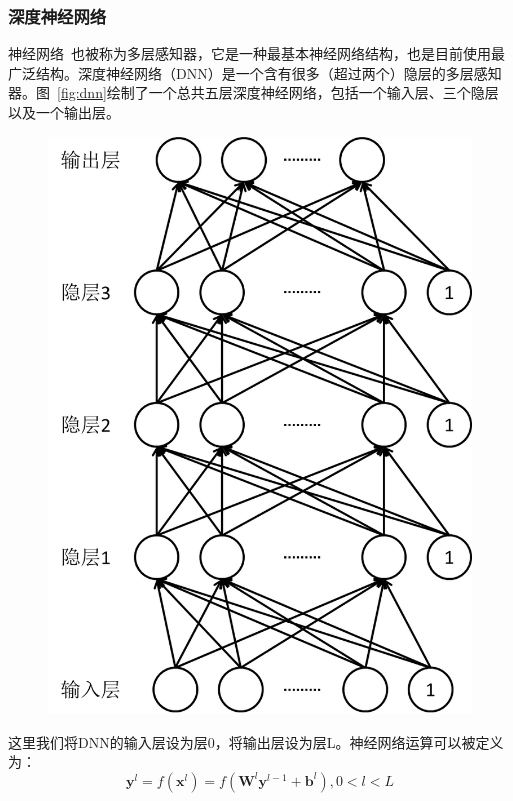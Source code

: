 \subsubsection{深度神经网络}
神经网络~\cite{rumelhart1986learning}也被称为多层感知器，它是一种最基本神经网络结构，也是目前使用最广泛结构。深度神经网络（DNN）是一个含有很多（超过两个）隐层的多层感知器。图~\ref{fig:dnn}绘制了一个总共五层深度神经网络，包括一个输入层、三个隐层以及一个输出层。
\begin{figure}[!htp]
  \centering
    \captionstyle{\centering}
    \includegraphics[height=.4\textheight]{figure/dnn.png}
\end{figure}
这里我们将DNN的输入层设为层0，将输出层设为层L。神经网络运算可以被定义为：
\begin{equation}
    \mathbf{y}^l=f(\mathbf{x}^l)=f(\mathbf{W}^l\mathbf{y}^{l-1}+\mathbf{b}^l), 0 < l < L
\end{equation}
